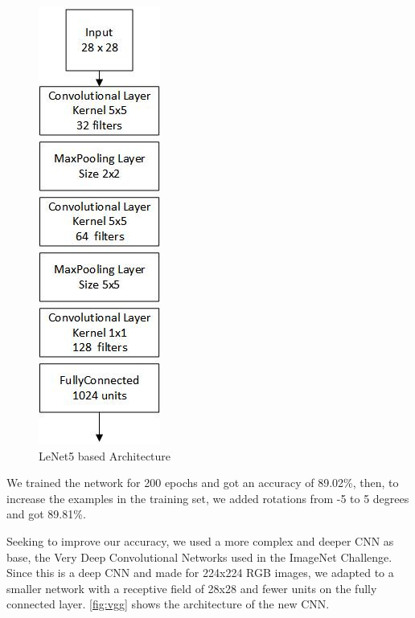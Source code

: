 \documentclass{article}
\begin{document}
    \begin{figure}[h]
    \begin{center}
        \includegraphics[scale=0.8]{lenet5Arch.jpg}
        \caption{LeNet5 based Architecture\label{fig:lenet5}}
    \end{center}
    \end{figure}
    
    
    We trained the network for 200 epochs and got an accuracy of 89.02\%, then, to increase the examples in the training set, we added rotations from -5 to 5 degrees and got 89.81\%.
    
    Seeking to improve our accuracy, we used a more complex and deeper CNN as base, the Very Deep Convolutional Networks \cite{DBLP:journals/corr/SimonyanZ14a} used in the  ImageNet Challenge. Since this is a deep CNN and made for 224x224 RGB images, we adapted to a smaller network with a receptive field of 28x28 and fewer units on the fully connected layer. \ref{fig:vgg} shows the architecture of the new CNN.
    
\end{document}
